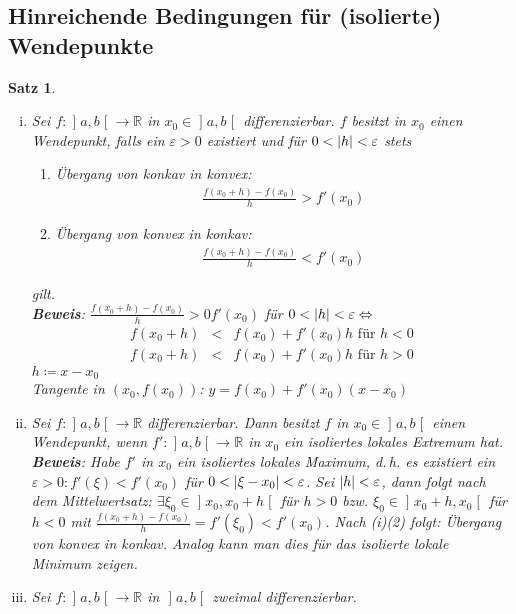 \documentclass[ngerman,titlepage,twoside, parskip=half*]{scrreprt}
\newcommand*{\R}{\mathbb{R}}
\theoremstyle{break}
\newtheorem{theorem}{Satz}[section]
\theoremstyle{nonumberbreak}
\DeclarePairedDelimiter{\abs}{\lvert}{\rvert}
\newcommand*{\bsofint}[1]{\mathopen{]}#1\mathclose{[}} %
\begin{document}
\subsection{Hinreichende Bedingungen für (isolierte) Wendepunkte}
\begin{theorem}
  \begin{enumerate}[(i)]
    \item Sei $f\colon\bsofint{a,b}\rightarrow\R$ in $x_0\in\bsofint{a,b}$ differenzierbar.
      $f$ besitzt in $x_0$ einen Wendepunkt, falls ein $\varepsilon>0$
      existiert und für $0<\abs{h}<\varepsilon$ stets
      \begin{enumerate}[(1)]
	\item Übergang von konkav in konvex:
	  \begin{gather*}\frac{f(x_0+h)-f(x_0)}{h}>f'(x_0)\end{gather*}
	\item Übergang von konvex in konkav:
	  \begin{gather*}\frac{f(x_0+h)-f(x_0)}{h}<f'(x_0)\end{gather*}
      \end{enumerate}
      gilt.\\
      \textbf{Beweis}: $\frac{f(x_0+h)-f(x_0)}{h}>0f'(x_0)$ für $0<\abs{h}
      <\varepsilon\Leftrightarrow$
      \begin{align*}
	f(x_0+h) & < & f(x_0)+f'(x_0)h \text{ für } h<0\\
	f(x_0+h) & < & f(x_0)+f'(x_0)h \text{ für } h>0
      \end{align*}
      $h\coloneqq x-x_0$\\
      Tangente in $(x_0,f(x_0))$: $y=f(x_0)+f'(x_0)(x-x_0)$
    \item Sei $f\colon\bsofint{a,b}\rightarrow\R$ differenzierbar. Dann besitzt $f$
      in $x_0\in\bsofint{a,b}$ einen Wendepunkt, wenn $f'\colon\bsofint{a,b}\rightarrow\R$
      in $x_0$ ein isoliertes lokales Extremum hat.\\
      \textbf{Beweis}: Habe $f'$ in $x_0$ ein isoliertes lokales Maximum,
      d.\,h. es existiert ein $\varepsilon>0\colon f'(\xi)<f'(x_0)$ für $0<
      \abs{\xi-x_0}<\varepsilon$. Sei $\abs{h}<\varepsilon$, dann folgt nach dem
      Mittelwertsatz: $\exists\xi_0\in \bsofint{x_0,x_0+h}$ für $h>0$ bzw.
      $\xi_0\in \bsofint{x_0+h,x_0}$ für $h<0$ mit $\frac{f(x_0+h)-f(x_0)}{h}
      =f'(\xi_0)<f'(x_0)$. Nach (i)(2) folgt: Übergang von konvex in
      konkav. Analog kann man dies für das isolierte lokale Minimum
      zeigen.
    \item Sei $f\colon\bsofint{a,b}\rightarrow\R$ in $\bsofint{a,b}$ zweimal differenzierbar.

\end{enumerate}
\end{theorem}
\end{document}
